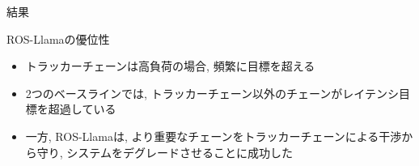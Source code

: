 \begin{frame}{結果}
\end{frame}

\begin{frame}{ROS-Llamaの優位性}
    \begin{itemize}
        \item トラッカーチェーンは高負荷の場合, 頻繁に目標を超える
        \item 2つのベースラインでは, トラッカーチェーン以外のチェーンがレイテンシ目標を超過している
        \item 一方, ROS-Llamaは, より重要なチェーンをトラッカーチェーンによる干渉から守り, システムをデグレードさせることに成功した
    \end{itemize}
\end{frame}




